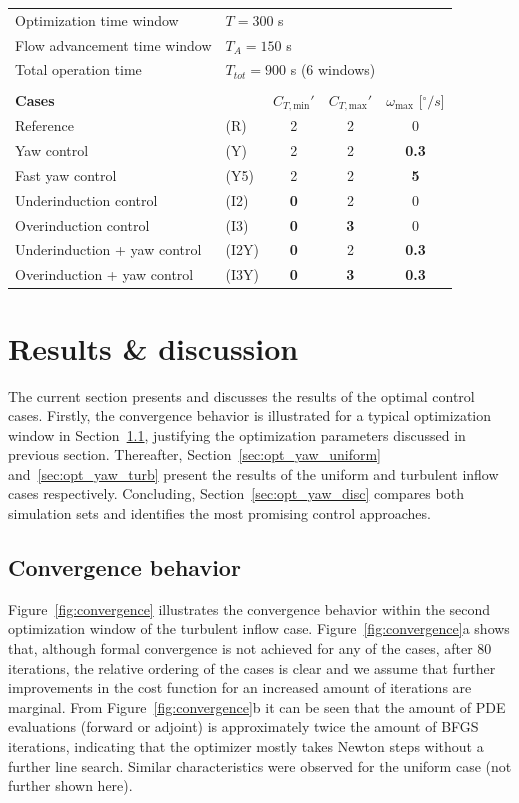\documentclass[energies,article,submit,moreauthors,latex,10pt,a4paper]{mdpi}
\newcommand{\revision}[1]{{\color{red} #1}}
\begin{document}
\begin{table}
\begin{tabular}{llccc}
		Optimization time window	& \multicolumn{4}{l}{$T = 300$ s}\\
		Flow advancement time window 	& \multicolumn{4}{l}{$T_A = 150$ s}\\
		Total operation time         	& \multicolumn{4}{l}{$T_{tot} = 900$ s (6 windows)}\\
		& & & & \\	
		\toprule
		\textbf{Cases} & \  & $C_{T,\text{min}}'$ & $C_{T,\text{max}}'$ & $\omega_{\text{max}}$ [$^\circ/s$] \\ 
		\toprule
		Reference & (R)    &  2 & 2 & 0   \\ 
		Yaw control & (Y)   &  2 & 2 & \textbf{0.3} \\ 
		Fast yaw control & (Y5)   &  2 & 2 &\textbf{5}   \\ 
		Underinduction control & (I2)    &  \textbf{0} & 2 & 0\\
		Overinduction control & (I3)    &  \textbf{0} & \textbf{3} & 0\\ 
		Underinduction + yaw control & (I2Y)   &  \textbf{0} & 2 & \textbf{0.3} \\ 
		Overinduction + yaw control & (I3Y)   &  \textbf{0} & \textbf{3} & \textbf{0.3} \\ 
		\bottomrule
	\end{tabular} 
\end{table}

\section{Results \& discussion}\label{sec:opt_yaw_results}
\noindent The current section presents and discusses the results of the optimal control cases. Firstly, the convergence behavior is illustrated for a typical optimization window in Section~\ref{sec:opt_convergence}, justifying the optimization parameters discussed in previous section. Thereafter, Section~\ref{sec:opt_yaw_uniform} and~\ref{sec:opt_yaw_turb} present the results of the uniform and turbulent inflow cases respectively. Concluding, Section~\ref{sec:opt_yaw_disc} compares both simulation sets and identifies the most promising control approaches.

\subsection{Convergence behavior}\label{sec:opt_convergence}
\noindent Figure~\ref{fig:convergence} illustrates the convergence behavior within the second optimization window of the \revision{turbulent} inflow case. Figure~\ref{fig:convergence}a shows that, although formal convergence is not achieved for any of the cases, after 80 iterations, the relative ordering of the cases is clear and we assume that further improvements in the cost function for an increased amount of iterations are marginal. From Figure~\ref{fig:convergence}b it can be seen that the amount of PDE evaluations (forward or adjoint) is approximately twice the amount of BFGS iterations, indicating that the optimizer mostly takes Newton steps without a further line search. Similar characteristics were observed for the \revision{uniform} case (not further shown here).
\end{document}
